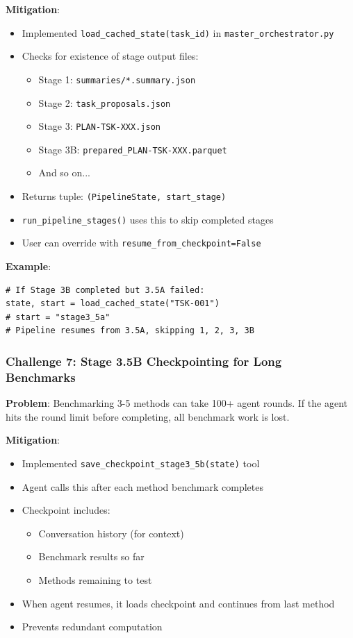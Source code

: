 \documentclass[11pt,a4paper]{article}
\begin{document}
\textbf{Mitigation}:
\begin{itemize}
    \item Implemented \texttt{load\_cached\_state(task\_id)} in \texttt{master\_orchestrator.py}
    \item Checks for existence of stage output files:
    \begin{itemize}
        \item Stage 1: \texttt{summaries/*.summary.json}
        \item Stage 2: \texttt{task\_proposals.json}
        \item Stage 3: \texttt{PLAN-TSK-XXX.json}
        \item Stage 3B: \texttt{prepared\_PLAN-TSK-XXX.parquet}
        \item And so on...
    \end{itemize}
    \item Returns tuple: \texttt{(PipelineState, start\_stage)}
    \item \texttt{run\_pipeline\_stages()} uses this to skip completed stages
    \item User can override with \texttt{resume\_from\_checkpoint=False}
\end{itemize}

\textbf{Example}:
\begin{verbatim}
# If Stage 3B completed but 3.5A failed:
state, start = load_cached_state("TSK-001")
# start = "stage3_5a"
# Pipeline resumes from 3.5A, skipping 1, 2, 3, 3B
\end{verbatim}

\subsubsection{Challenge 7: Stage 3.5B Checkpointing for Long Benchmarks}

\textbf{Problem}: Benchmarking 3-5 methods can take 100+ agent rounds. If the agent hits the round limit before completing, all benchmark work is lost.

\textbf{Mitigation}:
\begin{itemize}
    \item Implemented \texttt{save\_checkpoint\_stage3\_5b(state)} tool
    \item Agent calls this after each method benchmark completes
    \item Checkpoint includes:
    \begin{itemize}
        \item Conversation history (for context)
        \item Benchmark results so far
        \item Methods remaining to test
    \end{itemize}
    \item When agent resumes, it loads checkpoint and continues from last method
    \item Prevents redundant computation
\end{itemize}
\end{document}
